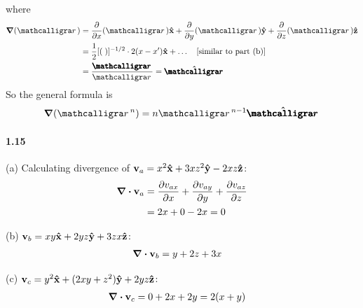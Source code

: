 \documentclass[../main.tex]{subfiles}
\begin{document}
where
\begin{align*}
    \grad{(\scriptr)} &= \pdv{x}(\scriptr) \vu{x} + \pdv{y}(\scriptr) \vu{y} + \pdv{z}(\scriptr) \vu{z} \\
    &= \frac{1}{2} [(\;)]^{-1/2} \cdot 2(x - x') \vu{x} + \dots \qqtext{[similar to part (b)]} \\
    &= \frac{\boldscriptr}{\scriptr} = \vu{\boldscriptr}
\end{align*}
So the general formula is
\begin{align*}
    \grad(\scriptr^n) = n \scriptr^{n-1} \vu{\boldscriptr}
\end{align*}

\newpage
\paragraph{1.15}
(a) Calculating divergence of $\vb v_a = x^2\vu{x} + 3xz^2\vu{y} - 2xz\vu{z}$:
\begin{align*}
    \div{\vb v_a} &= \pdv{v_{ax}}{x} + \pdv{v_{ay}}{y} + \pdv{v_{az}}{z} \\
    &= 2x + 0 - 2x = 0
\end{align*}

(b) $\vb v_b = xy\vu{x} + 2yz\vu{y} + 3zx\vu{z}$:
\begin{align*}
    \div{\vb v_b} &= y + 2z + 3x
\end{align*}

(c) $\vb v_c = y^2\vu{x} + (2xy + z^2)\vu{y} + 2yz\vu{z}$:
\begin{align*}
    \div{\vb v_c} &= 0 + 2x + 2y = 2(x + y)
\end{align*}

\newpage
\end{document}
